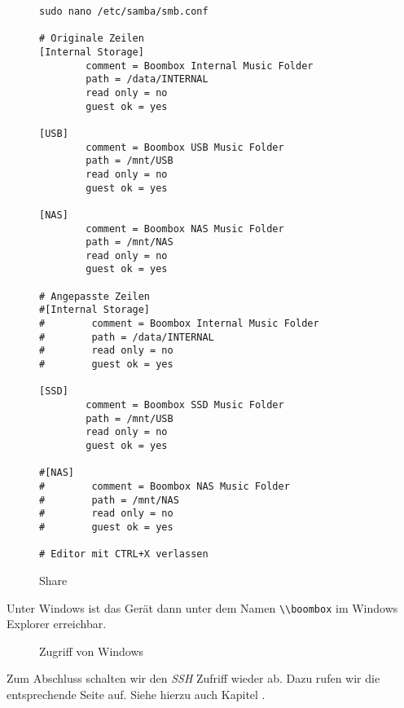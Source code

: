 \documentclass[12pt,a4paper]{article}
\newcommand{\code}[1]{\texttt{#1}}
\newcommand{\jpaimg}[2]{\begin{figure}[H]\centering\fbox{\texttt{[image: \#1]}}\caption{#2}\label{fig:#2}\end{figure}}
\begin{document}
\begin{figure}[H]
\begin{lstlisting}
sudo nano /etc/samba/smb.conf

# Originale Zeilen
[Internal Storage]
        comment = Boombox Internal Music Folder
        path = /data/INTERNAL
        read only = no
        guest ok = yes

[USB]
        comment = Boombox USB Music Folder
        path = /mnt/USB
        read only = no
        guest ok = yes

[NAS]
        comment = Boombox NAS Music Folder
        path = /mnt/NAS
        read only = no
        guest ok = yes

# Angepasste Zeilen
#[Internal Storage]
#        comment = Boombox Internal Music Folder
#        path = /data/INTERNAL
#        read only = no
#        guest ok = yes

[SSD]
        comment = Boombox SSD Music Folder
        path = /mnt/USB
        read only = no
        guest ok = yes

#[NAS]
#        comment = Boombox NAS Music Folder
#        path = /mnt/NAS
#        read only = no
#        guest ok = yes

# Editor mit CTRL+X verlassen
\end{lstlisting}
\caption{Share}\label{fig:Share}
\end{figure}

Unter Windows ist das Gerät dann unter dem Namen \code{\textbackslash{}\textbackslash{}boombox} im Windows Explorer erreichbar.

\jpaimg{./../images/win-bb.png}{Zugriff von Windows}

Zum Abschluss schalten wir den \textit{SSH} Zufriff wieder ab. Dazu rufen wir die entsprechende Seite auf. Siehe hierzu auch Kapitel .

\clearpage{}
\listoffigures\thispagestyle{fancy}
\newpage


\renewcommand{\indexname}{Stichwortverzeichnis}
\clearpage{}
\printindex\thispagestyle{fancy}
\newpage
\end{document}
